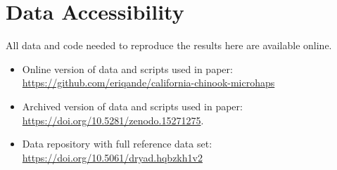 \section*{Data Accessibility}

All data and code needed to reproduce the results here are available online.
\begin{itemize}
\item Online version of data and scripts used in paper: \\
        \url{https://github.com/eriqande/california-chinook-microhaps}
\item Archived version of data and scripts used in paper: \\
        \url{https://doi.org/10.5281/zenodo.15271275}.
\item Data repository with full reference data set: \\
        \url{https://doi.org/10.5061/dryad.hqbzkh1v2}
\end{itemize}
\mbox{}

